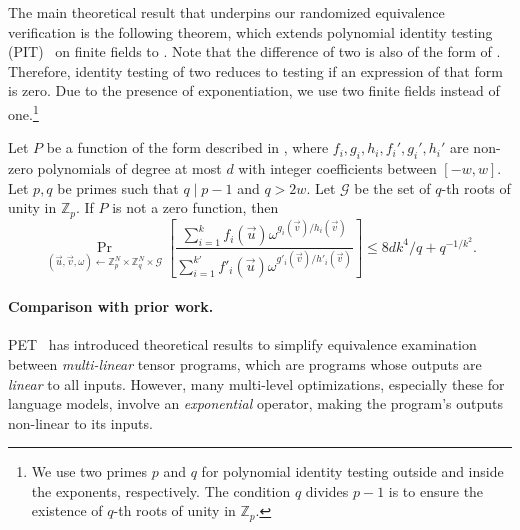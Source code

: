 The main theoretical result that underpins our randomized equivalence verification is the following theorem, which extends polynomial identity testing (PIT)~\cite{schwartz1980fast, zippel1979probabilistic} on finite fields to \lax \graphs. Note that the difference of two \lax \graphs is also of the form of . Therefore, identity testing of two \lax \graphs reduces to testing if an expression of that form is zero.
Due to the presence of exponentiation, we use two finite fields instead of one.\footnote{We use two primes $p$ and $q$ for polynomial identity testing \cite{schwartz1980fast, zippel1979probabilistic} outside and inside the exponents, respectively. The condition $q$ divides $p - 1$ is to ensure the existence of $q$-th roots of unity in $\mathbb{Z}_p$.}

\begin{theorem}
\label{thm:zero_test}
Let $P$ be a function of the form described in ,
where
$f_i, g_i, h_i, f_i', g_i', h_i'$ are non-zero polynomials of degree at most $d$ with integer coefficients between $[-w, w]$. Let $p, q$ be primes such that $q \mid p-1$ and $q > 2w$. Let $\mathcal{G}$ be the set of $q$-th roots of unity in $\mathbb{Z}_p$. If $P$ is not a zero function, then \cite{identitytesting}
\[
\Pr_{(\vec u, \vec v, \omega) \gets \mathbb{Z}_p^N\times \mathbb{Z}_q^N \times \mathcal{G}}\left[\frac{\sum_{i=1}^k f_i(\vec u) \omega^{g_i(\vec v)/h_i(\vec v)}}{\sum_{i=1}^{k'} f'_i(\vec u) \omega^{g'_i(\vec v)/h'_i(\vec v)}}\right] \le 8dk^4/q + q^{-1/k^2}.
\]
\end{theorem}

\iffinal
\fi 

\paragraph{Comparison with prior work.}  PET~\cite{wang2021pet} has introduced theoretical results to simplify equivalence examination between {\em multi-linear} tensor programs, which are programs whose outputs are {\em linear} to all inputs.
%
However, many multi-level optimizations, especially these for language models, involve an {\em exponential} operator, making the program's outputs non-linear to its inputs.
\fi 

